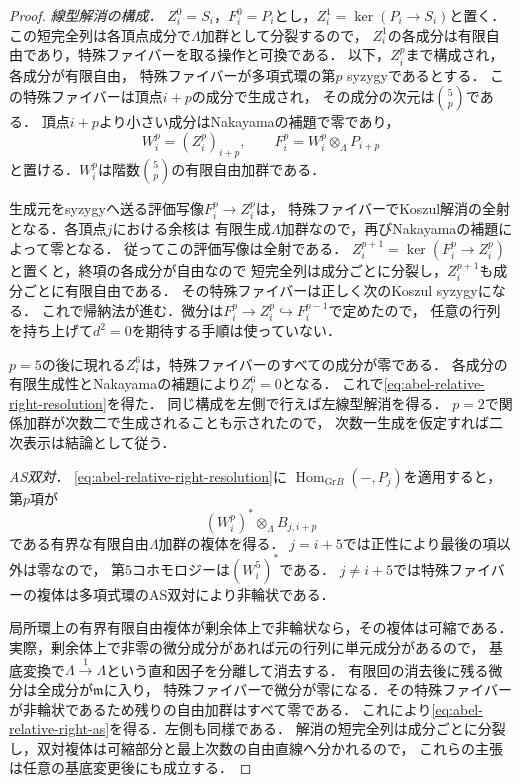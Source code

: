 \begin{proof}
\emph{線型解消の構成．}
$Z_i^0=S_i$，$F_i^0=P_i$とし，$Z_i^1=\ker(P_i\to S_i)$と置く．
この短完全列は各頂点成分で$\Lambda$加群として分裂するので，
$Z_i^1$の各成分は有限自由であり，特殊ファイバーを取る操作と可換である．
以下，$Z_i^p$まで構成され，各成分が有限自由，
特殊ファイバーが多項式環の第$p$ syzygyであるとする．
この特殊ファイバーは頂点$i+p$の成分で生成され，
その成分の次元は$\binom5p$である．
頂点$i+p$より小さい成分はNakayamaの補題で零であり，
\[
 W_i^p=(Z_i^p)_{i+p},\qquad
 F_i^p=W_i^p\otimes_\Lambda P_{i+p}
\]
と置ける．$W_i^p$は階数$\binom5p$の有限自由加群である．

生成元をsyzygyへ送る評価写像$F_i^p\to Z_i^p$は，
特殊ファイバーでKoszul解消の全射となる．各頂点$j$における余核は
有限生成$\Lambda$加群なので，再びNakayamaの補題によって零となる．
従ってこの評価写像は全射である．
$Z_i^{p+1}=\ker(F_i^p\to Z_i^p)$と置くと，終項の各成分が自由なので
短完全列は成分ごとに分裂し，$Z_i^{p+1}$も成分ごとに有限自由である．
その特殊ファイバーは正しく次のKoszul syzygyになる．
これで帰納法が進む．微分は$F_i^p\to Z_i^p\hookrightarrow F_i^{p-1}$で定めたので，
任意の行列を持ち上げて$d^2=0$を期待する手順は使っていない．

$p=5$の後に現れる$Z_i^6$は，特殊ファイバーのすべての成分が零である．
各成分の有限生成性とNakayamaの補題により$Z_i^6=0$となる．
これで\eqref{eq:abel-relative-right-resolution}を得た．
同じ構成を左側で行えば左線型解消を得る．
$p=2$で関係加群が次数二で生成されることも示されたので，
次数一生成を仮定すれば二次表示は結論として従う．

\emph{AS双対．}
\eqref{eq:abel-relative-right-resolution}に
$\operatorname{Hom}_{\mathrm{Gr}B}(-,P_j)$を適用すると，
第$p$項が
\[
 (W_i^p)^*\otimes_\Lambda B_{j,i+p}
\]
である有界な有限自由$\Lambda$加群の複体を得る．
$j=i+5$では正性により最後の項以外は零なので，
第$5$コホモロジーは$(W_i^5)^*$である．
$j\ne i+5$では特殊ファイバーの複体は多項式環のAS双対により非輪状である．

局所環上の有界有限自由複体が剰余体上で非輪状なら，その複体は可縮である．
実際，剰余体上で非零の微分成分があれば元の行列に単元成分があるので，
基底変換で$\Lambda\xrightarrow{1}\Lambda$という直和因子を分離して消去する．
有限回の消去後に残る微分は全成分が$\mathfrak m$に入り，
特殊ファイバーで微分が零になる．その特殊ファイバーが非輪状であるため残りの自由加群はすべて零である．
これにより\eqref{eq:abel-relative-right-as}を得る．左側も同様である．
解消の短完全列は成分ごとに分裂し，双対複体は可縮部分と最上次数の自由直線へ分かれるので，
これらの主張は任意の基底変更後にも成立する．


\end{proof}
